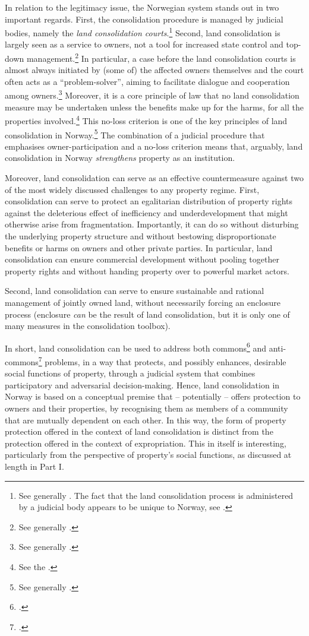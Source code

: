 In relation to the legitimacy issue, the Norwegian system stands out in two important regards. First, the consolidation procedure is managed by judicial bodies, namely the {\it land consolidation courts}.\footnote{See generally \cite{langbach09}. The fact that the land consolidation process is administered by a judicial body appears to be unique to Norway, see \cite[45]{sky01}.} Second, land consolidation is largely seen as a service to owners, not a tool for increased state control and top-down management.\footnote{See generally \cite{sky09}.} In particular, a case before the land consolidation courts is almost always initiated by (some of) the affected owners themselves and the court often acts as a ``problem-solver'', aiming to facilitate dialogue and cooperation among owners.\footnote{See generally \cite{rognes98,rognes03,rognes07}.} Moreover, it is a core principle of law that no land consolidation measure may be undertaken unless the benefits make up for the harms, for all the properties involved.\footnote{See the \cite[3 a)]{lca79}.} This no-loss criterion is one of the key principles of land consolidation in Norway.\footnote{See generally \cite{rygg98}.} The combination of a judicial procedure that emphasises owner-participation and a no-loss criterion means that, arguably, land consolidation in Norway {\it strengthens} property as an institution.

Moreover, land consolidation can serve as an effective countermeasure against two of the most widely discussed challenges to any property regime. First, consolidation can serve to protect an egalitarian distribution of property rights against the deleterious effect of inefficiency and underdevelopment that might otherwise arise from fragmentation. Importantly, it can do so without disturbing the underlying property structure and without bestowing disproportionate benefits or harms on owners and other private parties. In particular, land consolidation can ensure commercial development without pooling together property rights and without handing property over to powerful market actors. 

Second, land consolidation can serve to ensure sustainable and rational management of jointly owned land, without necessarily forcing an enclosure process (enclosure {\it can} be the result of land consolidation, but it is only one of many measures in the consolidation toolbox).

In short, land consolidation can be used to address both commons\footcite{hardin68} and anti-commons\footcite{heller98} problems, in a way that protects, and possibly enhances, desirable social functions of property, through a judicial system that combines  participatory and adversarial decision-making. Hence, land consolidation in Norway is based on a conceptual premise that -- potentially -- offers protection to owners and their properties, by recognising them as members of a community that are mutually dependent on each other. In this way, the form of property protection offered in the context of land consolidation is distinct from the protection offered in the context of expropriation. This in itself is interesting, particularly from the perspective of property's social functions, as discussed at length in Part I.

